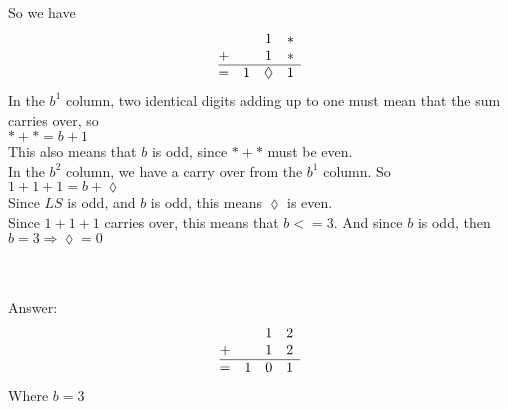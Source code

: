 \documentclass[12pt]{article}
\begin{document}
So we have\\
\[
	\begin{array}{@{}cccc}
		  &   & 1        & * \\
		+ &   & 1        & * \\
		\hline
		= & 1 & \lozenge & 1
	\end{array}
\]
In the $b^1$ column, two identical digits adding up to one must mean that the sum carries over, so \\
$* + * = b + 1$\\
This also means that $b$ is odd, since $* + *$ must be even.\\

In the  $b^2$ column, we have a carry over from the $b^1$ column. So \\
$1+1+1 = b+\lozenge $\\
Since $LS$ is odd, and $b$ is odd, this means $\lozenge$ is even.\\
Since $1+1+1$ carries over, this means that $b<=3$. And since $b$ is odd, then $b = 3 \Longrightarrow \lozenge = 0$


~\\\\Answer:
\[
	\begin{array}{@{}cccc}
		  &   & 1 & 2 \\
		+ &   & 1 & 2 \\
		\hline
		= & 1 & 0 & 1
	\end{array}
\]
Where $b = 3$
\end{document}
